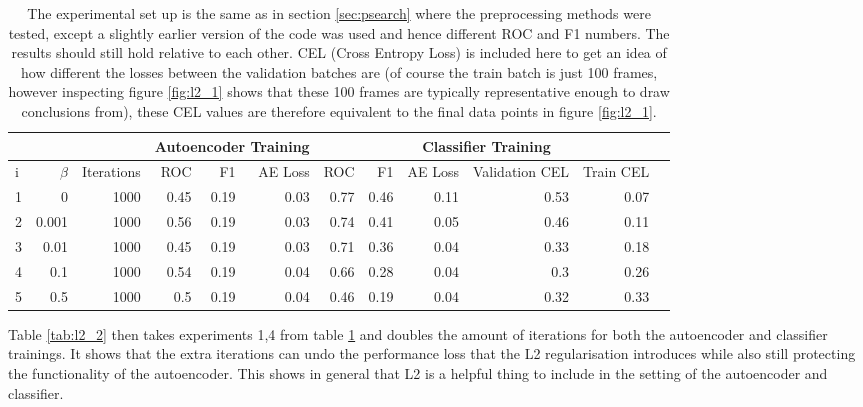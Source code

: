           \begin{table}[!h] {\footnotesize \centering
          \begin{tabular}{lrrrrrrrrrrr}
            &&&   \multicolumn{3}{|c|}{Autoencoder Training} &  \multicolumn{5}{c|}{Classifier Training}  \\
          \hline
           i & $\beta$ &   Iterations &   ROC&F1&AE Loss & ROC & F1 & AE Loss &   Validation CEL &   Train CEL \\
          \hline
           1 &     0     & 1000 &    0.45 &   0.19 &     0.03 &    0.77 &   0.46 &     0.11 &  0.53 &  0.07 \\
           2 &     0.001 & 1000 &    0.56 &   0.19 &     0.03 &    0.74 &   0.41 &     0.05 &  0.46 &  0.11 \\
           3 &     0.01  & 1000 &    0.45 &   0.19 &     0.03 &    0.71 &   0.36 &     0.04 &  0.33 &  0.18 \\
           4 &     0.1   & 1000 &    0.54 &   0.19 &     0.04 &    0.66 &   0.28 &     0.04 &  0.3  &  0.26 \\
           5 &     0.5   & 1000 &    0.5  &   0.19 &     0.04 &    0.46 &   0.19 &     0.04 &  0.32 &  0.33 \\
          \hline
        \end{tabular}
        \caption{The experimental set up is the same as in section \ref{sec:psearch} where the preprocessing methods
        were tested, except a slightly earlier version
        of the code was used and hence different ROC and F1 numbers.
        The results should still hold relative to each other.
        CEL (Cross Entropy Loss) is included here to get an idea of how different
        the losses between the validation batches are (of course the
        train batch is just 100 frames, however inspecting figure \ref{fig:l2_1} shows that
        these 100 frames are typically representative enough to draw conclusions from), these
        CEL values are therefore equivalent to the final data points in figure \ref{fig:l2_1}. } \label{tab:l2_1}
        }
        \end{table}

        Table \ref{tab:l2_2} then takes experiments 1,4 from table \ref{tab:l2_1} and doubles
        the amount of iterations for both the autoencoder and classifier trainings. It shows
        that the extra iterations can undo the performance loss that the L2 regularisation
        introduces while also still protecting the functionality of the autoencoder.
        This shows in general that L2 is a helpful thing to include in the setting of the autoencoder
        and classifier.

